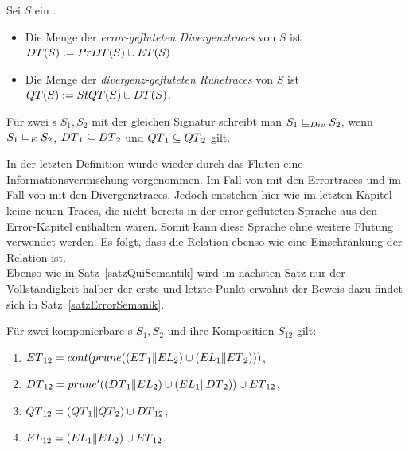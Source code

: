 \begin{Def}
\label{DefRuheDivSemantik}
  Sei $S$ ein \EIO{}.
  \begin{itemize}
    \item Die Menge der \emph{error-gefluteten Divergenztraces} von $S$ ist
      $DT{}(S) := PrDT{}(S)\cup ET{}(S)$.
    \item Die Menge der \emph{divergenz-gefluteten Ruhetraces} von $S$ ist
      $QT{}(S) := StQT{}(S)\cup DT{}(S)$.
  \end{itemize}
  Für zwei \EIO{}s $S_1, S_2$ mit der gleichen Signatur schreibt man $S_1\sqsubseteq _{Div}
  S_2$, wenn $S_1\sqsubseteq _E S_2$, $DT{}_1\subseteq DT{}_2$ und
  $QT{}_1\subseteq QT{}_2$ gilt.
\end{Def}

In der letzten Definition wurde wieder durch das Fluten eine
Informationsvermischung vorgenommen. Im Fall von \DT{} mit den Errortraces und
im Fall von \QT{} mit den Divergenztraces. Jedoch entstehen hier wie im letzten
Kapitel keine neuen Traces, die nicht bereits in der error-gefluteten Sprache
\EL{} aus den Error-Kapitel enthalten wären. Somit kann diese Sprache ohne
weitere Flutung verwendet werden. Es folgt, dass die Relation \DRel{} ebenso
wie \QRel{} eine Einschränkung der Relation \ERel{} ist.\\
Ebenso wie in Satz~\ref{satzQuiSemantik} wird im nächsten Satz nur der
Vollständigkeit halber der erste und letzte Punkt erwähnt der Beweis dazu
findet sich in Satz~\ref{satzErrorSemanik}.

\begin{satz}
\label{satzDivSemantik}
  Für zwei komponierbare \EIO{}s $S_1, S_2$ und ihre Komposition
  $S_{12}$ gilt:
  \begin{enumerate}
    \item $ET{}_{12}=cont (prune ((ET{}_1\|EL{}_2)\cup
      (EL{}_1\|ET{}_2)))$,
    \item $DT{}_{12}= prune'{}((DT{}_1\|EL{}_2)\cup
      (EL{}_1\|DT{}_2))\cup ET{}_{12}$,
    \item $QT{}_{12}=(QT{}_1\|QT{}_2)\cup DT{}_{12}$,
    \item $EL{}_{12}=(EL{}_1\|EL{}_2)\cup ET{}_{12}$.
  \end{enumerate}
\end{satz}

